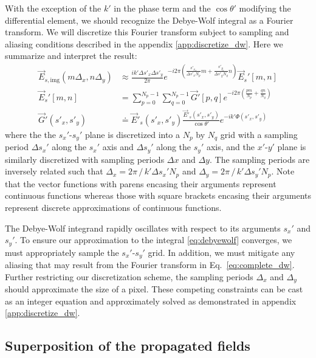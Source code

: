 With the exception of the $k'$ in the phase term and the $\cos{\theta'}$ 
modifying the differential element, we should recognize the
Debye-Wolf integral as a Fourier transform. We will discretize this
Fourier transform subject to sampling and aliasing conditions described
in the appendix \ref{app:discretize_dw}. Here we summarize and interpret the result:
\begin{equation}
  \begin{split}
    \vec{E}_{s,\text{img}}( m \Delta_x, n \Delta_y) & \approx \frac{i k' \Delta s'_x \Delta s'_y}{2 \pi} e^{-i2\pi \left ( \frac{s'_{x_o}}{\Delta s'_x N_p} m + \frac{s'_{y_o}}{\Delta s'_yN_q} n \right ) } \vec{E}_s'\left [ m, n \right ] \\
    \vec{E}_s'\left [ m,n \right ] & = \sum_{p=0}^{N_p-1}\sum_{q=0}^{N_p-1}\vec{G}'\left [p,q\right ] e^{-i2\pi \left ( \frac{pm}{N_p}+\frac{qn}{N_q} \right ) } \\
    \vec{G}'(s'_x,s'_y) & \doteq \vec{E}'_s(s'_x,s'_y)\frac{\vec{E}'_s(s'_x,s'_y)}{\cos{\theta'}}e^{-ik'\Phi(s'_x,s'_y)}
  \end{split}
  \label{eq:complete_dw}
\end{equation}
where the the $s_x'$-$s_y'$ plane is discretized into a
$N_p$ by $N_q$ grid with a sampling period $\Delta s_x'$ along the $s_x'$ axis and
$\Delta s_y'$ along the $s_y'$ axis, and the $x'$-$y'$ plane is similarly discretized with
sampling periods $\Delta x$ and $\Delta y$.
The sampling periods are inversely related such that $\Delta_x = 2\pi \, / \, k' \Delta s_x' N_p$
and $\Delta_y = 2\pi \, / \, k' \Delta s_y' N_p$.
Note that the vector functions with parens encasing their arguments represent
continuous functions whereas those with square brackets encasing their arguments represent
discrete approximations of continuous functions.

The Debye-Wolf integrand rapidly oscillates with respect to its arguments $s_x'$ and $s_y'$.
To ensure our approximation to the integral \eqref{eq:debyewolf} converges, we
must appropriately sample the $s_x'$-$s_y'$ grid. In addition, we must mitigate any
aliasing that may result from the Fourier transform in Eq.~\eqref{eq:complete_dw}.
Further restricting our discretization scheme, the sampling periods $\Delta_x$
and $\Delta_y$ should approximate the size of a pixel. These competing constraints
can be cast as an integer equation and approximately solved as demonstrated
in appendix \ref{app:discretize_dw}.

\subsection{Superposition of the propagated fields}

